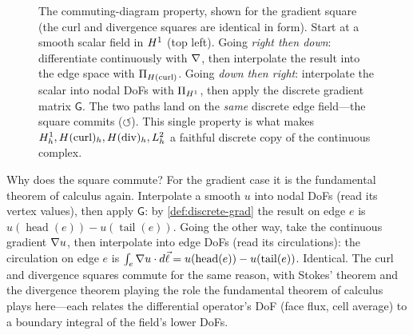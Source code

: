 \begin{figure}[t]
\centering
{}
\caption[The commuting diagram]{The commuting-diagram property, shown for the
gradient square (the curl and divergence squares are identical in form). Start at a
smooth scalar field in $H^1$ (top left). Going \emph{right then down}: differentiate
continuously with $\nabla$, then interpolate the result into the edge space with
$\Pi_{H(\mathrm{curl})}$. Going \emph{down then right}: interpolate the scalar into nodal DoFs
with $\Pi_{H^1}$, then apply the discrete gradient matrix $\mathsf{G}$. The two
paths land on the \emph{same} discrete edge field---the square commits
($\circlearrowleft$). This single property is what makes $H^1_h,H(\mathrm{curl})_h,H(\mathrm{div})_h,
L^2_h$ a faithful discrete copy of the continuous complex.}
\label{fig:commute}
\end{figure}

Why does the square commute? For the gradient case it is the fundamental theorem of
calculus again. Interpolate a smooth $u$ into nodal DoFs (read its vertex values),
then apply $\mathsf{G}$: by \cref{def:discrete-grad} the result on edge $e$ is
$u(\operatorname{head}(e))-u(\operatorname{tail}(e))$. Going the other way, take the
continuous gradient $\nabla u$, then interpolate into edge DoFs (read its
circulations): the circulation on edge $e$ is
$\int_e\nabla u\cdot d\vec\ell=u(\operatorname{head}(e))-u(\operatorname{tail}(e))$.
Identical. The curl and divergence squares commute for the same reason, with Stokes'
theorem and the divergence theorem playing the role the fundamental theorem of
calculus plays here---each relates the differential operator's DoF (face flux, cell
average) to a boundary integral of the field's lower DoFs.

